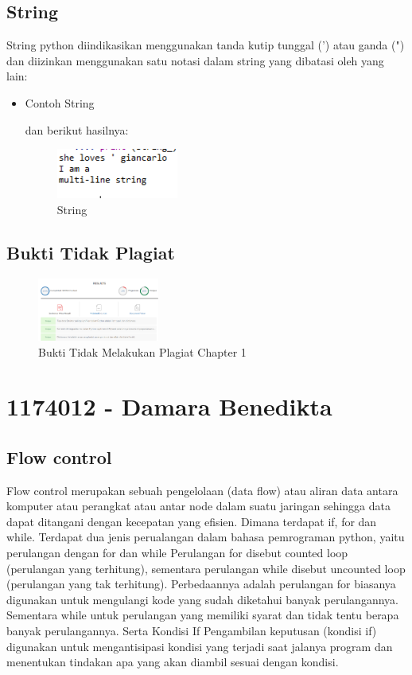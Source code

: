 \subsection{String}
	\hfill\break
	String python diindikasikan menggunakan tanda kutip tunggal (') atau ganda (") dan diizinkan menggunakan satu notasi dalam string yang dibatasi oleh yang lain:
	\begin{itemize}
		\item Contoh String
		\hfill\break
	           
		\hfill\break
		dan berikut hasilnya:
		\begin{figure}[H]
		\includegraphics[width=4cm]{figures/kelompok1/1/anam/string.png}
		\centering
		\caption{String}
		\end{figure}
	\end{itemize}

\subsection{Bukti Tidak Plagiat}
\begin{figure}[H]
	\includegraphics[width=4cm]{figures/kelompok1/1/anam/plagiat_anam.png}
	\centering
	\caption{Bukti Tidak Melakukan Plagiat Chapter 1}
\end{figure}

\section{1174012 - Damara Benedikta}
\subsection{Flow control }
Flow control merupakan sebuah pengelolaan (data flow) atau aliran data antara komputer atau perangkat atau antar node dalam suatu jaringan sehingga data dapat ditangani dengan kecepatan yang efisien.
Dimana terdapat if, for dan while. Terdapat dua jenis perualangan dalam bahasa pemrograman python, yaitu perulangan dengan for dan while
Perulangan for disebut counted loop (perulangan yang terhitung), sementara perulangan while disebut uncounted loop (perulangan yang tak terhitung). Perbedaannya adalah perulangan for biasanya digunakan untuk mengulangi kode yang sudah diketahui banyak perulangannya. Sementara while untuk perulangan yang memiliki syarat dan tidak tentu berapa banyak perulangannya.
Serta Kondisi If Pengambilan keputusan (kondisi if) digunakan untuk mengantisipasi kondisi yang terjadi saat jalanya program dan menentukan tindakan apa yang akan diambil sesuai dengan kondisi.
\hfill\break

\hfill\break

